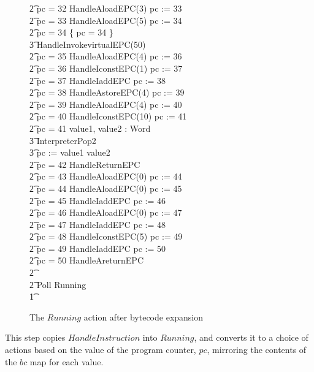 \begin{figure}[tp!]
\begin{minipage}{0.5\textwidth}
{\begin{circus}
    \t2 {} \circelse pc = 32 \circthen HandleAloadEPC(3) \circseq pc := 33 \\
    \t2 {} \circelse pc = 33 \circthen HandleAloadEPC(5) \circseq pc := 34 \\
    \t2 {} \circelse pc = 34 \circthen \{ pc = 34 \} \circseq \\
    \t3 HandleInvokevirtualEPC(50) \\
    \t2 {} \circelse pc = 35 \circthen HandleAloadEPC(4) \circseq pc := 36 \\
    \t2 {} \circelse pc = 36 \circthen HandleIconstEPC(1) \circseq pc := 37 \\
    \t2 {} \circelse pc = 37 \circthen HandleIaddEPC \circseq pc := 38 \\
    \t2 {} \circelse pc = 38 \circthen HandleAstoreEPC(4) \circseq pc := 39 \\
    \t2 {} \circelse pc = 39 \circthen HandleAloadEPC(4) \circseq pc := 40 \\
    \t2 {} \circelse pc = 40 \circthen HandleIconstEPC(10) \circseq pc := 41 \\
    \t2 {} \circelse pc = 41 \circthen \circvar value1, value2 : Word \circspot \\
    \t3 InterpreterPop2 \circseq \\
    \t3 pc := \IF value1 \leq value2   \\
    \t2 {} \circelse pc = 42 \circthen HandleReturnEPC \\
    \t2 {} \circelse pc = 43 \circthen HandleAloadEPC(0) \circseq pc := 44 \\
    \t2 {} \circelse pc = 44 \circthen HandleAloadEPC(0) \circseq pc := 45 \\
    \t2 {} \circelse pc = 45 \circthen HandleIaddEPC \circseq pc := 46 \\
    \t2 {} \circelse pc = 46 \circthen HandleAloadEPC(0) \circseq pc := 47 \\
    \t2 {} \circelse pc = 47 \circthen HandleIaddEPC \circseq pc := 48 \\
    \t2 {} \circelse pc = 48 \circthen HandleIconstEPC(5) \circseq pc := 49 \\
    \t2 {} \circelse pc = 49 \circthen HandleIaddEPC \circseq pc := 50 \\
    \t2 {} \circelse pc = 50 \circthen HandleAreturnEPC \\
    \t2 {} \cdots {} \\
    \t2 \circfi \circseq Poll \circseq Running \\
    \t1 \circfi
  \end{circus}
  }
  \end{minipage}
  \normalsize
  \caption{The $Running$ action after bytecode expansion}
  \label{bytecode-expansion-example-figure}
\end{figure}
This step copies $HandleInstruction$ into $Running$, and converts it
to a choice of actions based on the value of the program counter,
$pc$, mirroring the contents of the $bc$ map for each value.

